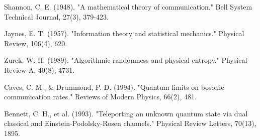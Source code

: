 \documentclass[11pt,a4paper]{article}
\theoremstyle{definition}
\begin{document}
\begin{thebibliography}{99}
 Shannon, C. E. (1948). "A mathematical theory of communication." Bell System Technical Journal, 27(3), 379-423.

 Jaynes, E. T. (1957). "Information theory and statistical mechanics." Physical Review, 106(4), 620.

 Zurek, W. H. (1989). "Algorithmic randomness and physical entropy." Physical Review A, 40(8), 4731.

 Caves, C. M., \& Drummond, P. D. (1994). "Quantum limits on bosonic communication rates." Reviews of Modern Physics, 66(2), 481.

 Bennett, C. H., et al. (1993). "Teleporting an unknown quantum state via dual classical and Einstein-Podolsky-Rosen channels." Physical Review Letters, 70(13), 1895.

\end{thebibliography}
\end{document}
